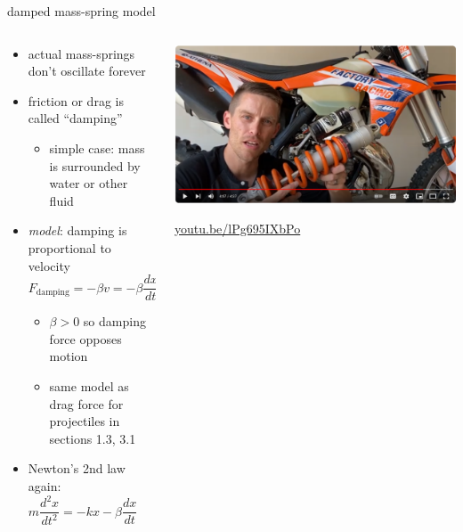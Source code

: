 \documentclass[dvipsnames,colorlinks]{beamer}
\begin{document}
\begin{frame}{damped mass-spring model}

\begin{columns}
\begin{column}{0.7\textwidth}
\begin{itemize}
\small
\item actual mass-springs don't oscillate forever
\item friction or drag is called ``damping''
    \begin{itemize}
    \item simple case: mass is surrounded by water or other fluid
    \end{itemize}
\item \emph{model}: damping is proportional to velocity
$$F_{\text{damping}} = - \beta v = - \beta \frac{dx}{dt}$$

\vspace{-2mm}
    \begin{itemize}
    \item $\beta > 0$ so damping force opposes motion
    \item same model as drag force for projectiles in sections 1.3, 3.1
    \end{itemize}
\item Newton's 2nd law again:
    $$\boxed{m \frac{d^2x}{dt^2} = - k x - \beta \frac{dx}{dt}} \qquad \text{or} \quad m x'' = -kx -\beta x'$$
\end{itemize}
\end{column}
\begin{column}{0.3\textwidth}
\includegraphics[width=1.2\textwidth]{figs/shockabsorber}

\scriptsize \href{https://youtu.be/lPg695IXbPo}{youtu.be/lPg695IXbPo}
\end{column}
\end{columns}
\end{frame}
\end{document}
